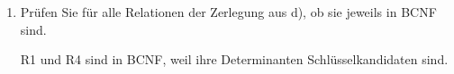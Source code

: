 \documentclass{bschlangaul-aufgabe}
\begin{document}
\begin{enumerate}
\begin{bAntwort}
\begin{itemize}
\r[R1]{\u{A, D}, E}\\
\r[R2]{\u{B, C}, A, E}\\
\r[R3]{\u{D}, B}\\
\r[R4]{\u{D, E}, C}\\
\r[R5]{\u{A}, F}

\item {}

\bNichtsZuTun

\item {}
\bNichtsZuTun

\end{itemize}
\end{bAntwort}


\item Prüfen Sie für alle Relationen der Zerlegung aus d), ob sie
jeweils in BCNF sind.

\begin{bAntwort}
R1 und R4 sind in BCNF, weil ihre Determinanten Schlüsselkandidaten
sind.
\end{bAntwort}

\end{enumerate}
\end{document}
